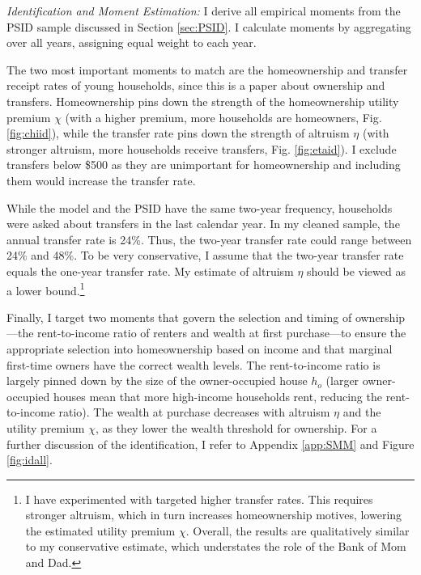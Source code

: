 \documentclass[12pt]{article}
\begin{document}
\textit{Identification and Moment Estimation:}
I derive all empirical moments from the PSID sample discussed in Section \ref{sec:PSID}. I calculate moments by aggregating over all years, assigning equal weight to each year.

The two most important moments to match are the homeownership and transfer receipt rates of young households, since this is a paper about ownership and transfers. Homeownership pins down the strength of the homeownership utility premium $\chi$ (with a higher premium, more households are homeowners, Fig. \ref{fig:chiid}), while the transfer rate pins down the strength of altruism $\eta$ (with stronger altruism, more households receive transfers, Fig. \ref{fig:etaid}). I exclude transfers below \$500 as they are unimportant for homeownership and including them would increase the transfer rate.

While the model and the PSID have the same two-year frequency, households were asked about transfers in the last calendar year. In my cleaned sample, the annual transfer rate is 24\%. Thus, the two-year transfer rate could range between 24\% and 48\%. To be very conservative, I assume that the two-year transfer rate equals the one-year transfer rate. My estimate of altruism $\eta$ should be viewed as a lower bound.\footnote{I have experimented with targeted higher transfer rates. This requires stronger altruism, which in turn increases homeownership motives, lowering the estimated utility premium $\chi$. Overall, the results are qualitatively similar to my conservative estimate, which understates the role of the Bank of Mom and Dad.}

Finally, I target two moments that govern the selection and timing of ownership---the rent-to-income ratio of renters and wealth at first purchase---to ensure the appropriate selection into homeownership based on income and that marginal first-time owners have the correct wealth levels. The rent-to-income ratio is largely pinned down by the size of the owner-occupied house $h_o$ (larger owner-occupied houses mean that more high-income households rent, reducing the rent-to-income ratio). The wealth at purchase decreases with altruism $\eta$ and the utility premium $\chi$, as they lower the wealth threshold for ownership. For a further discussion of the identification, I refer to Appendix \ref{app:SMM} and Figure \ref{fig:idall}.
\end{document}
